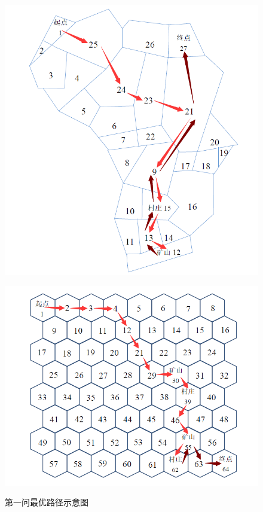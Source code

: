 \documentclass[withoutpreface,bwprint]{cumcmthesis} %
\begin{document}
\begin{figure}
    \centering
    \begin{minipage}[c]{0.45\textwidth}
        \centering
        \includegraphics[width=.95\textwidth]{figures/gate1.png}
        \label{gate1}
    \end{minipage}
    \begin{minipage}[c]{0.45\textwidth}
        \centering
        \includegraphics[width=.95\textwidth]{figures/gate2.png}
        \label{gate2}
    \end{minipage}
    \caption{第一问最优路径示意图}
    \label{q1}
\end{figure}
\end{document}
